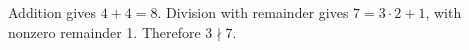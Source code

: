 Addition gives $\boxed{4+4=8}$. Division with remainder gives $7=3\cdot 2+1$, with nonzero remainder 1. Therefore $\boxed{3\nmid 7}$.
